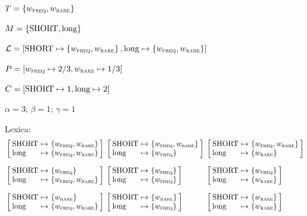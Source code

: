 \documentclass{article}
\begin{document}
\newcommand{\mSHORT}{\text{SHORT}}
\newcommand{\mLONG}{\text{long}}

\newcommand{\mannerstate}[1]{w_{\textsc{#1}}}
\newcommand{\wFREQ}{\mannerstate{freq}}
\newcommand{\wRARE}{\mannerstate{rare}}


\newcommand{\mannerlex}[2]{
  \left[
    \begin{array}[c]{l@{ \ \mapsto \ } l}
      \mSHORT & \set{#1} \\
      \mLONG & \set{#2}
    \end{array}
  \right]}

\begin{examples}
\item 
  \begin{examples}
  \item $\States = \set{\wFREQ,\wRARE}$ 
  \item $\Messages = \set{\mSHORT, \mLONG}$
  \item $\Lex = [\mSHORT \mapsto \set{\wFREQ,\wRARE}, \mLONG \mapsto \set{\wFREQ,\wRARE}]$
  \item $\Prior = [\wFREQ \mapsto 2/3, \wRARE \mapsto 1/3]$
  \item $\Costs = [\mSHORT \mapsto 1, \mLONG \mapsto 2]$
  \item $\alpha = 3$; $\beta = 1$; $\gamma = 1$  
  \item Lexica:
    \[
    \setlength{\arraycolsep}{2pt} 
    \begin{array}[c]{l l l}
      \mannerlex{\wFREQ,\wRARE}{\wFREQ,\wRARE}
      &
      \mannerlex{\wFREQ,\wRARE}{\wFREQ}
      &
      \mannerlex{\wFREQ,\wRARE}{\wRARE}
      \\[4ex]
      \mannerlex{\wFREQ}{\wFREQ,\wRARE}
      &
      \mannerlex{\wFREQ}{\wFREQ}
      &
      \mannerlex{\wFREQ}{\wRARE}
      \\[4ex]
      \mannerlex{\wRARE}{\wFREQ,\wRARE}
      &
      \mannerlex{\wRARE}{\wFREQ}
      &
      \mannerlex{\wRARE}{\wRARE}
    \end{array}
    \]
  \end{examples}
\end{examples}
\end{document}
